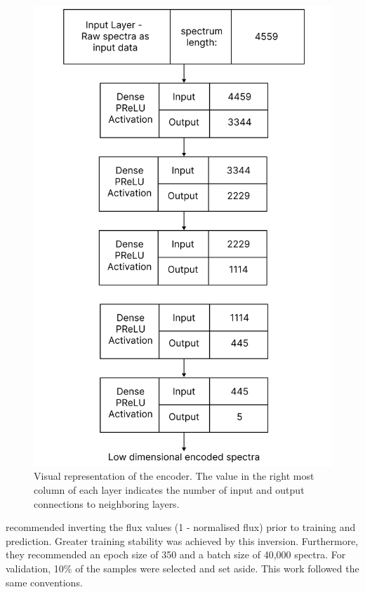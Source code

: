 \begin{figure}[!htb]
\centering
\includegraphics[scale=0.13]{figures/autoencoder diagram.png}
\caption{Visual representation of the encoder. The value in
the right most column of each layer indicates the number of input and output
connections to neighboring layers.}
\end{figure}

\citet{vcotar2021galah} recommended inverting the flux values (1 - normalised flux) prior to training and prediction. Greater training stability was achieved by this inversion. Furthermore, they recommended an epoch size of 350 and a batch size of 40,000 spectra. For validation, 10\% of the samples were selected and set aside. This work followed the same conventions. 

